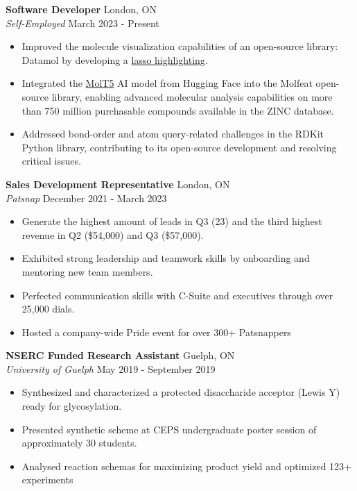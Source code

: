 \documentclass[a4paper]{article}
\begin{document}
\textbf{Software Developer} \hfill London, ON\\
\textit{Self-Employed} \hfill March 2023 - Present\\
\vspace{-1mm}
\begin{itemize} \itemsep 1pt
	\item Improved the molecule visualization capabilities of an open-source library: Datamol by developing a \href{https://twitter.com/datamol_io/status/1648351782329028608?s=46}{lasso highlighting}. 
	\item Integrated the \href{https://huggingface.co/laituan245}{MolT5} AI model from Hugging Face into the Molfeat open-source library, enabling advanced molecular analysis capabilities on more than 750 million purchasable compounds available in the ZINC database.
        \item Addressed bond-order and atom query-related challenges in the RDKit Python library, contributing to its open-source development and resolving critical issues.
\end{itemize}


\textbf{Sales Development Representative} \hfill London, ON \\
\textit{Patsnap} \hfill December 2021 - March 2023 \\
\vspace{-1mm}
\begin{itemize} \itemsep 1pt
	\item Generate the highest amount of leads in Q3 (23) and the third highest revenue in Q2 (\$54,000) and Q3 (\$57,000).
	\item Exhibited strong leadership and teamwork skills by onboarding and mentoring new team members.
	\item Perfected communication skills with C-Suite and executives through over 25,000 dials.
        \item Hosted a company-wide Pride event for over 300+ Patsnappers
\end{itemize}



\textbf{NSERC Funded Research Assistant } \hfill Guelph, ON\\
\textit{University of Guelph} \hfill May 2019 - September 2019\\
\vspace{-1mm}
\begin{itemize} \itemsep 1pt
        
	\item Synthesized and characterized a protected disaccharide acceptor (Lewis Y) ready for glycosylation.
	\item Presented synthetic scheme at CEPS undergraduate poster session of approximately 30 students.
        \item Analysed reaction schemas for maximizing product yield and optimized 123+ experiments
\end{itemize}
\end{document}
